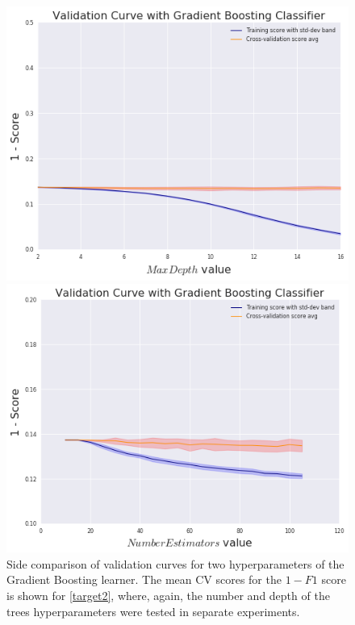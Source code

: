 \begin{figure}
\centering
\begin{minipage}{.5\textwidth}
  \includegraphics[width=.8\linewidth]{figures/gradient-boosting/validation_curve_boosting_depth_series_f1}
\end{minipage}%
\begin{minipage}{.5\textwidth}
  \includegraphics[width=.8\linewidth]{figures/gradient-boosting/validation_curve_boosting_num_trees_series_f1}
  \end{minipage}
\caption{ Side comparison of validation curves for two hyperparameters of the Gradient Boosting learner. The mean CV scores for the $1 - F1$ score is shown for \cref{target2}, where, again, the number and depth of the trees hyperparameters were tested in separate experiments.}
\label{fig:f1_boosting_validation_curves_depth_num_trees}
\end{figure}


